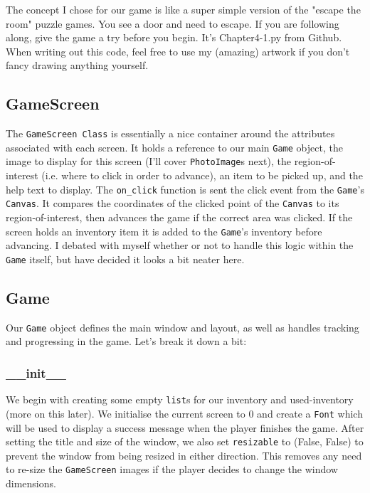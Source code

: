 \documentclass[a4paper,11pt,openany]{book}
\begin{document}
The concept I chose for our game is like a super simple version of the "escape the room" puzzle games. You see a door and need to escape. If you are following along, give the game a try before you begin. It's Chapter4-1.py from Github. When writing out this code, feel free to use my (amazing) artwork if you don't fancy drawing anything yourself. 

 

\subsection{GameScreen}

The  \lstinline[columns=fixed]{GameScreen Class} is essentially a nice container around the attributes associated with each screen. It holds a reference to our main \lstinline[columns=fixed]{Game} object, the image to display for this screen (I'll cover \lstinline[columns=fixed]{PhotoImage}s next), the region-of-interest (i.e. where to click in order to advance), an item to be picked up, and the help text to display. The \lstinline[columns=fixed]{on_click} function is sent the click event from the \lstinline[columns=fixed]{Game}'s \lstinline[columns=fixed]{Canvas}. It compares the coordinates of the clicked point of the \lstinline[columns=fixed]{Canvas} to its region-of-interest, then advances the game if the correct area was clicked. If the screen holds an inventory item it is added to the \lstinline[columns=fixed]{Game}'s inventory before advancing. I debated with myself whether or not to handle this logic within the \lstinline[columns=fixed]{Game} itself, but have decided it looks a bit neater here. 

\subsection{Game}
Our \lstinline[columns=fixed]{Game} object defines the main window and layout, as well as handles tracking and progressing in the game. Let's break it down a bit:

\subsubsection{\_\_init\_\_}

We begin with creating some empty \lstinline[columns=fixed]{list}s for our inventory and used-inventory (more on this later). We initialise the current screen to 0 and create a \lstinline[columns=fixed]{Font} which will be used to display a success message when the player finishes the game. After setting the title and size of the window, we also set \lstinline[columns=fixed]{resizable} to (False, False) to prevent the window from being resized in either direction. This removes any need to re-size the \lstinline[columns=fixed]{GameScreen} images if the player decides to change the window dimensions.
\end{document}
